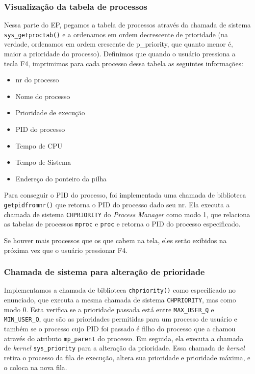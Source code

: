 \documentclass[]{article}
\providecommand{\tightlist}{%
  \setlength{\itemsep}{0pt}\setlength{\parskip}{0pt}}
\begin{document}
\hypertarget{visualizauxe7uxe3o-da-tabela-de-processos-1}{%
\subsubsection{Visualização da tabela de
processos}\label{visualizauxe7uxe3o-da-tabela-de-processos-1}}

Nessa parte do EP, pegamos a tabela de processos através da chamada de
sistema \texttt{sys\_getproctab()} e a ordenamos em ordem decrescente de
prioridade (na verdade, ordenamos em ordem crescente de p\_priority, que
quanto menor é, maior a prioridade do processo). Definimos que quando o
usuário pressiona a tecla F4, imprimimos para cada processo dessa tabela
as seguintes informações:

\begin{itemize}
\tightlist
\item
  nr do processo
\item
  Nome do processo
\item
  Prioridade de execução
\item
  PID do processo
\item
  Tempo de CPU
\item
  Tempo de Sistema
\item
  Endereço do ponteiro da pilha
\end{itemize}

Para conseguir o PID do processo, foi implementada uma chamada de
biblioteca \texttt{getpidfromnr()} que retorna o PID do processo dado
seu nr. Ela executa a chamada de sistema \texttt{CHPRIORITY} do
\emph{Process Manager} como modo 1, que relaciona as tabelas de
processos \texttt{mproc} e \texttt{proc} e retorna o PID do processo
especificado.

Se houver mais processos que os que cabem na tela, eles serão exibidos
na próxima vez que o usuário pressionar F4.

\hypertarget{chamada-de-sistema-para-alterauxe7uxe3o-de-prioridade-1}{%
\subsubsection{Chamada de sistema para alteração de
prioridade}\label{chamada-de-sistema-para-alterauxe7uxe3o-de-prioridade-1}}

Implementamos a chamada de biblioteca \texttt{chpriority()} como
especificado no enunciado, que executa a mesma chamada de sistema
\texttt{CHPRIORITY}, mas como modo 0. Esta verifica se a prioridade
passada está entre \texttt{MAX\_USER\_Q} e \texttt{MIN\_USER\_Q}, que
são as prioridades permitidas para um processo de usuário e também se o
processo cujo PID foi passado é filho do processo que a chamou através
do atributo \texttt{mp\_parent} do processo. Em seguida, ela executa a
chamada de \emph{kernel} \texttt{sys\_priority} para a alteração da
prioridade. Essa chamada de \emph{kernel} retira o processo da fila de
execução, altera sua prioridade e prioridade máxima, e o coloca na nova
fila.
\end{document}
